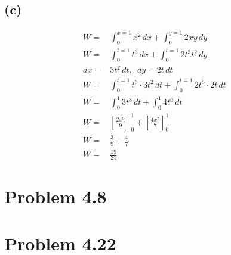 \documentclass[12pt, a4paper]{article}
\begin{document}
\subsection*{(c)}
\begin{align*}
W =& \int_0^{x=1} x^2 \, dx + \int_0^{y=1} 2xy \, dy
\\
W =& \int_0^{t=1} t^6 \, dx + \int_0^{t=1} 2t^3t^2 \, dy
\\
dx =& 3t^2 \,dt, \,\,\, dy = 2t \,dt
\\
W =& \int_0^{t=1} t^6 \cdot 3t^2 \,dt + \int_0^{t=1} 2t^5 \cdot 2t \,dt
\\
W =& \int_0^1 3t^8 \,dt + \int_0^1 4t^6 \,dt
\\
W =& \left[ \frac{2x^9}{9} \right]_0^1 + 
   \left[ \frac{4x^7}{7}\right]_0^1
\\
W =& \frac{3}{9} + \frac{4}{7}
\\
W =& \boxed{\frac{19}{21}}
\end{align*}







\pagebreak
\section*{Problem 4.8}










\pagebreak
\section*{Problem 4.22}
\end{document}
